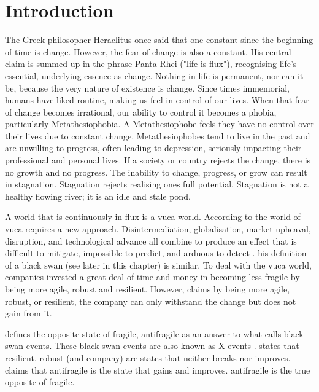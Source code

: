 \chapter{Introduction}
\label{ch:introduction}

The Greek philosopher Heraclitus once said that one constant since the beginning of time is change. However, the fear of change is also a constant.  His central claim is summed up in the phrase Panta Rhei ("life is flux"), recognising life's essential, underlying essence as change. Nothing in life is permanent, nor can it be, because the very nature of existence is change. Since times immemorial, humans have liked routine, making us feel in control of our lives. When that fear of change becomes irrational, our ability to control it becomes a phobia, particularly Metathesiophobia. A Metathesiophobe feels they have no control over their lives due to constant change. Metathesiophobes tend to live in the past and are unwilling to progress, often leading to depression, seriously impacting their professional and personal lives. If a society or country rejects the change, there is no growth and no progress. The inability to change, progress, or grow can result in stagnation. Stagnation rejects realising ones full potential. Stagnation is not a healthy flowing river; it is an idle and stale pond. \parencite{Mark2010, Arapahoe2020}

A world that is continuously in flux is a \acrfull{vuca} world. According to \textcite{Bennett2014} the world of \acrshort{vuca} requires a new approach. Disintermediation, globalisation, market upheaval, disruption, and technological advance all combine to produce an effect that is difficult to mitigate,  impossible to predict, and arduous to detect \parencite[p. 885]{OReilly2019}. \textcite{Taleb2008} his definition of a black swan (see later in this chapter) is similar. To deal with the \acrshort{vuca} world, companies invested a great deal of time and money in becoming less \gls{fragile} by being more \gls{agile}, \gls{robust} and \gls{resilient}. However, \textcite{Taleb2012} claims by being more \gls{agile}, \gls{robust}, or \gls{resilient}, the company can only withstand the change but does not gain from it.

\textcite{Taleb2012} defines the opposite state of \gls{fragile}, \gls{antifragile} as an answer to what \textcite{Taleb2008} calls black swan events. These black swan events are also known as X-events \parencite{Casti2013}. \textcite{Taleb2012} states that \gls{resilient}, \gls{robust} (and company) are states that neither breaks nor improves. \textcite{Taleb2012} claims that \gls{antifragile} is the state that gains and improves. \Gls{antifragile} is the true opposite of \gls{fragile}.

